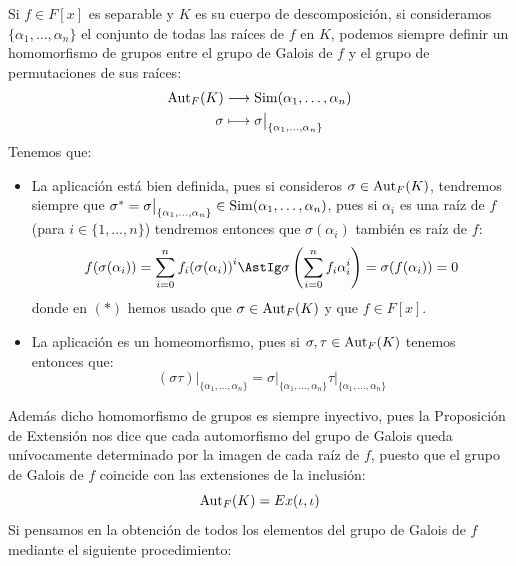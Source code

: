 Si $f\in F[x]$ es separable y $K$ es su cuerpo de descomposición, si consideramos $\{\alpha_1, \ldots, \alpha_n\}$ el conjunto de todas las raíces de $f$ en $K$, podemos siempre definir un homomorfismo de grupos entre el grupo de Galois de $f$ y el grupo de permutaciones de sus raíces:
\begin{align*}
    \operatorname{Aut}_F(K) &\longrightarrow \operatorname{Sim}(\alpha_1, \ldots, \alpha_n) \\
    \sigma&\longmapsto \sigma\big|_{\{\alpha_1, \ldots, \alpha_n\}}
\end{align*}
Tenemos que:
\begin{itemize}
    \item La aplicación está bien definida, pues si consideros $\sigma\in \operatorname{Aut}_F(K)$, tendremos siempre que $\sigma^\ast = \sigma\big|_{\{\alpha_1, \ldots, \alpha_n\}}\in \operatorname{Sim}(\alpha_1, \ldots, \alpha_n)$, pues si $\alpha_i$ es una raíz de $f$ (para $i \in \{1,\ldots,n\}$) tendremos entonces que $\sigma(\alpha_i)$ también es raíz de $f$:
        \begin{equation*}
            f(\sigma(\alpha_i)) = \sum_{i=0}^n f_i {(\sigma(\alpha_i))}^{i} \AstIg \sigma\left(\sum_{i=0}^{n}f_i \alpha_i^i\right) = \sigma(f(\alpha_i)) = 0
        \end{equation*}
        donde en $(\ast)$ hemos usado que $\sigma\in \operatorname{Aut}_F(K)$ y que $f\in F[x]$.
    \item La aplicación es un homeomorfismo, pues si $\sigma,\tau\in \operatorname{Aut}_F(K)$ tenemos entonces que:
        \begin{equation*}
            (\sigma\tau)\big|_{\{\alpha_1, \ldots, \alpha_n\}} = \sigma\big|_{\{\alpha_1, \ldots, \alpha_n\}}\tau\big|_{\{\alpha_1, \ldots, \alpha_n\}}
        \end{equation*}
\end{itemize}
Además dicho homomorfismo de grupos es siempre inyectivo, pues la Proposición de Extensión nos dice que cada automorfismo del grupo de Galois queda unívocamente determinado por la imagen de cada raíz de $f$, puesto que el grupo de Galois de $f$ coincide con las extensiones de la inclusión:
\begin{equation*}
    \operatorname{Aut}_F(K) = Ex(\iota,\iota)
\end{equation*}
Si pensamos en la obtención de todos los elementos del grupo de Galois de $f$ mediante el siguiente procedimiento:
